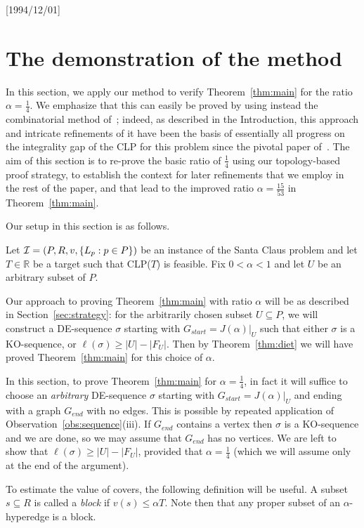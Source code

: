 \NeedsTeXFormat{LaTeX2e}[1994/12/01]\documentclass[letterpaper, 11pt]{article}
\theoremstyle{definition}
\theoremstyle{remark}
\numberwithin{equation}{section}
\begin{document}
\section{The demonstration of the method} \label{sec:warmup}

In this section, we apply our method to verify
Theorem~\ref{thm:main} for the ratio $\alpha=\frac{1}{4}$. We emphasize that
this can easily be proved by using instead the combinatorial method
of~\cite{haxell}; indeed, as described in the Introduction, this approach
and intricate refinements of it
have been the basis of essentially all progress on the integrality gap
of the CLP for this problem since the pivotal paper
of~\cite{asadpourfeigesaberi}. 
The aim of this section is to re-prove the basic ratio of
$\frac{1}{4}$ using our topology-based proof strategy, to establish the
context for later refinements that we employ in the rest of the paper, and that lead to
the improved ratio $\alpha=\frac{15}{53}$ in Theorem~\ref{thm:main}.


Our setup in this section is as follows.

\bigskip
{}
Let ${\cal I} = (P, R , v, \{L_p : p\in P\})$ be an instance of the
Santa Claus problem and let $T\in \mathbb{R}$ be a target such that
CLP($T$) is feasible. Fix $0 < \alpha < 1$ and let $U$ be
an arbitrary subset of $P$. 
\bigskip

Our approach to proving  Theorem~\ref{thm:main} with ratio $\alpha$
will be as described in Section~\ref{sec:strategy}: for the
arbitrarily chosen subset $U\subseteq P$, we will construct a
DE-sequence $\sigma$ starting with 
  $G_{start}=J(\alpha)|_U$ such that either $\sigma$ is a KO-sequence, or
  $\ell(\sigma)\geq |U|-|F_U|$.  Then by Theorem~\ref{thm:diet} we
  will have proved Theorem~\ref{thm:main} for this choice of
  $\alpha$. 

In this section, to prove  Theorem~\ref{thm:main}
for $\alpha=\frac14$, in fact it will suffice to choose an {\em
  arbitrary} DE-sequence $\sigma$ starting 
with $G_{start}=J(\alpha)|_U$ and ending with a graph $G_{end}$ with
no edges. This is possible by repeated application of
Observation~\ref{obs:sequence}(iii). 
If $G_{end}$ contains a vertex then $\sigma$ is a KO-sequence and we
are done, so we may assume that $G_{end}$ has no vertices.
We are left to show that $\ell (\sigma) \geq |U|-|F_U|$, provided that
$\alpha=\frac14$ (which we will assume only at the end of the argument).

To estimate the value of covers,  the following definition will be useful.
A subset $s\subseteq R$ is called a {\em block} if $v(s) \leq \alpha T$. Note then that any proper subset of an $\alpha$-hyperedge is 
a block. 
\end{document}
